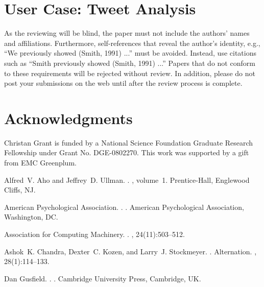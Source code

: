 \documentclass[11pt,letterpaper]{article}
\begin{document}
\section{User Case: Tweet Analysis}
\label{sec:blind}

As the reviewing will be blind, the paper must not include the authors' names and affiliations. Furthermore, self-references that reveal the author's identity, e.g., ``We previously showed (Smith, 1991) ...'' must be avoided. Instead, use citations such as ``Smith previously showed (Smith, 1991) ...'' Papers that do not conform to these requirements will be rejected without review. In addition, please do not post your submissions on the web until after the review process is complete.

\section*{Acknowledgments}
Christan Grant is funded by a National
Science Foundation Graduate Research Fellowship under Grant No. DGE-0802270.
This work was supported by a gift from EMC Greenplum.

\begin{thebibliography}{}

Alfred~V. Aho and Jeffrey~D. Ullman.
.
, volume~1.
\newblock Prentice-{Hall}, Englewood Cliffs, NJ.

{American Psychological Association}.
.
.
\newblock American Psychological Association, Washington, DC.

{Association for Computing Machinery}.
.
, 24(11):503--512.

Ashok~K. Chandra, Dexter~C. Kozen, and Larry~J. Stockmeyer.
.
\newblock Alternation.
,
  28(1):114--133.

Dan Gusfield.
.
.
\newblock Cambridge University Press, Cambridge, UK.

\end{thebibliography}
\end{document}
